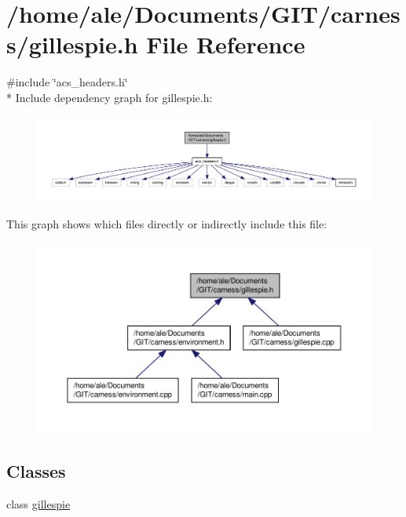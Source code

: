 \hypertarget{a00082}{\section{/home/ale/\-Documents/\-G\-I\-T/carness/gillespie.h File Reference}
\label{a00082}
}
{\ttfamily \#include \char`\"{}acs\-\_\-headers.\-h\char`\"{}}\\*
Include dependency graph for gillespie.\-h\-:\nopagebreak
\begin{figure}[H]
\begin{center}
\leavevmode
\includegraphics[width=350pt]{a00130}
\end{center}
\end{figure}
This graph shows which files directly or indirectly include this file\-:\nopagebreak
\begin{figure}[H]
\begin{center}
\leavevmode
\includegraphics[width=350pt]{a00131}
\end{center}
\end{figure}
\subsection*{Classes}
\begin{DoxyCompactItemize}
\item 
class \hyperlink{a00009}{gillespie}
\end{DoxyCompactItemize}
